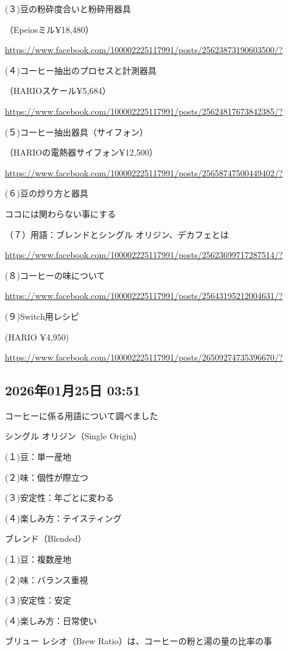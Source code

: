 (３)豆の粉砕度合いと粉砕用器具

（Epeiosミル¥18,480）

\url{https://www.facebook.com/100002225117991/posts/25623873190603500/?}

(４)コーヒー抽出のプロセスと計測器具

（HARIOスケール¥5,684）

\url{https://www.facebook.com/100002225117991/posts/25624817673842385/?}

(５)コーヒー抽出器具（サイフォン）

（HARIOの電熱器サイフォン¥12,500）

\url{https://www.facebook.com/100002225117991/posts/25658747500449402/?}

(６)豆の炒り方と器具

ココには関わらない事にする

（７）用語：ブレンドとシングル オリジン、デカフェとは

\url{https://www.facebook.com/100002225117991/posts/25623699717287514/?}

(８)コーヒーの味について

\url{https://www.facebook.com/100002225117991/posts/25643195212004631/?}

(９)Switch用レシピ

(HARIO ¥4,950)

\url{https://www.facebook.com/100002225117991/posts/26509274735396670/?}

\subsection*{2026年01月25日 03:51}

コーヒーに係る用語について調べました

シングル オリジン（Single Origin）

(１)豆：単一産地

(２)味：個性が際立つ

(３)安定性：年ごとに変わる

(４)楽しみ方：テイスティング

ブレンド（Blended）

(１)豆：複数産地

(２)味：バランス重視

(３)安定性：安定

(４)楽しみ方：日常使い

ブリュー レシオ（Brew Ratio）は、コーヒーの粉と湯の量の比率の事

